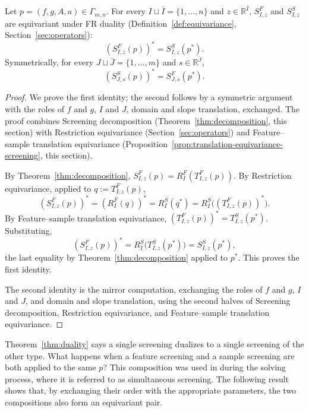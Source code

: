 \begin{theorem}
\label{thm:duality}
Let \(p=(f,g,A,a)\in\Gamma_{m,n}\). For every
\(I\sqcup\bar I=\{1,\ldots,n\}\) and \(z\in\mathbb R^{\bar I}\),
\(S^F_{I,z}\) and \(S^S_{I,z}\) are equivariant under FR duality
(Definition~\ref{def:equivariance}, Section~\ref{sec:operators}):
\[
\left(S^{F}_{I,z}(p)\right)^*
=
S^{S}_{I,z}(p^*).
\]
Symmetrically, for every \(J\sqcup\bar J=\{1,\ldots,m\}\) and
\(s\in\mathbb R^{\bar J}\),
\[
\left(S^{S}_{J,s}(p)\right)^*
=
S^{F}_{J,s}(p^*).
\]
\end{theorem}

\begin{proof}
We prove the first identity; the second follows by a symmetric argument
with the roles of \(f\) and \(g\), \(I\) and \(J\), domain and slope
translation, exchanged. The proof combines Screening decomposition
(Theorem~\ref{thm:decomposition}, this section) with Restriction
equivariance (Section~\ref{sec:operators}) and Feature--sample
translation equivariance
(Proposition~\ref{prop:translation-equivariance-screening}, this
section).

By Theorem~\ref{thm:decomposition}, \(S^F_{I,z}(p)=R^F_I(T^F_{I,z}(p))\).
By Restriction equivariance, applied to \(q:=T^F_{I,z}(p)\),
\[
\left(S^F_{I,z}(p)\right)^*
=
\left(R^F_I(q)\right)^*
=
R^S_I(q^*)
=
R^S_I\bigl((T^F_{I,z}(p))^*\bigr).
\]
By Feature--sample translation equivariance,
\((T^F_{I,z}(p))^*=T^S_{I,z}(p^*)\). Substituting,
\[
\left(S^F_{I,z}(p)\right)^*
=
R^S_I\bigl(T^S_{I,z}(p^*)\bigr)
=
S^S_{I,z}(p^*),
\]
the last equality by Theorem~\ref{thm:decomposition} applied to \(p^*\).
This proves the first identity.

The second identity is the mirror computation, exchanging the roles of
\(f\) and \(g\), \(I\) and \(J\), and domain and slope translation,
using the second halves of Screening decomposition, Restriction
equivariance, and Feature--sample translation equivariance.
\end{proof}


Theorem~\ref{thm:duality} says a single screening dualizes to a single
screening of the other type. What happens when a feature screening and a sample screening are both applied to the same \(p\)? 
This composition was used in \citep{shibagaki2016simultaneous} during the solving process, where it is referred to as simultaneous screening. The following result shows that, by exchanging their order with the appropriate parameters, the two compositions also form an equivariant pair.

